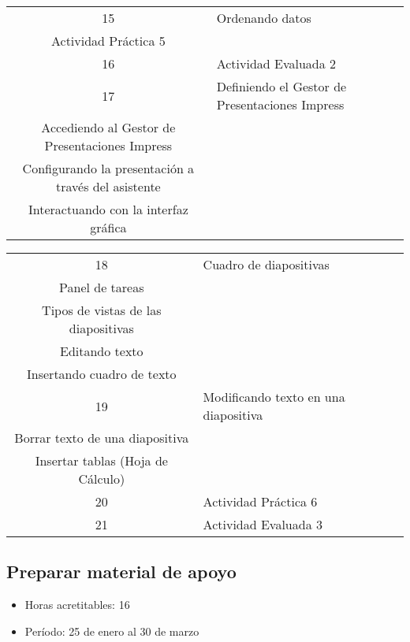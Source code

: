 \begin{center}
\begin{tabular}{|c|p{10cm}|}
                        15 & \raggedright Ordenando datos
                        \\ Actividad Práctica 5
                        \tabularnewline \hline
                        
                        16 & \raggedright Actividad Evaluada 2
                        \tabularnewline \hline

                        17 & \raggedright Definiendo el Gestor de Presentaciones Impress\cite{impress}
                        \\ Accediendo al Gestor de Presentaciones Impress
                        \\ Configurando la presentación a través del asistente
                        \\ Interactuando con la interfaz gráfica
                        \tabularnewline \hline
                         
                        \end{tabular}     
                        
                        \begin{tabular}{|c|p{10cm}|}\hline 
                        
                        18 & \raggedright Cuadro de diapositivas
                        \\ Panel de tareas
                        \\ Tipos de vistas de las diapositivas
                        \\ Editando texto
                        \\ Insertando cuadro de texto
                        \tabularnewline \hline
                        19 & \raggedright Modificando texto en una diapositiva
                        \\ Borrar texto de una diapositiva
                        \\ Insertar tablas (Hoja de Cálculo)
                        \tabularnewline \hline
                        
                        20 & \raggedright Actividad Práctica 6
                        \tabularnewline \hline
                        21 & \raggedright Actividad Evaluada 3
                        \tabularnewline \hline
                        
            \end{tabular}                                
            \end{center}	 
             \subsection {Preparar material de apoyo}
             \begin{itemize}
                 \item Horas acretitables: 16
                 \item Período: 25 de enero al 30 de marzo
                \end{itemize}
                
